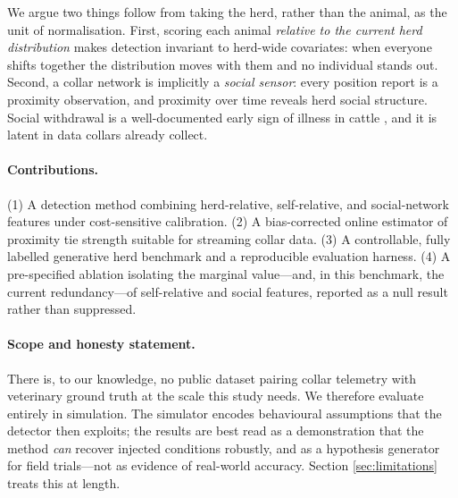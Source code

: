 \documentclass[11pt]{article}
\begin{document}
We argue two things follow from taking the herd, rather than the animal, as the
unit of normalisation. First, scoring each animal \emph{relative to the current
herd distribution} makes detection invariant to herd-wide covariates: when
everyone shifts together the distribution moves with them and no individual
stands out. Second, a collar network is implicitly a \emph{social sensor}: every
position report is a proximity observation, and proximity over time reveals herd
social structure. Social withdrawal is a well-documented early sign of illness in
cattle \citep{weary2009painful,proudfoot2012social}, and it is latent in data
collars already collect.

\paragraph{Contributions.}
(1) A detection method combining herd-relative, self-relative, and
social-network features under cost-sensitive calibration. (2) A bias-corrected
online estimator of proximity tie strength suitable for streaming collar data.
(3) A controllable, fully labelled generative herd benchmark and a reproducible
evaluation harness. (4) A pre-specified ablation isolating the marginal
value---and, in this benchmark, the current redundancy---of self-relative and
social features, reported as a null result rather than suppressed.

\paragraph{Scope and honesty statement.}
There is, to our knowledge, no public dataset pairing collar telemetry with
veterinary ground truth at the scale this study needs. We therefore evaluate
entirely in simulation. The simulator encodes behavioural assumptions that the
detector then exploits; the results are best read as a demonstration that the
method \emph{can} recover injected conditions robustly, and as a hypothesis
generator for field trials---not as evidence of real-world accuracy. Section
\ref{sec:limitations} treats this at length.
\end{document}

